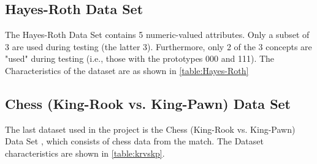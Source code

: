 \subsection{Hayes-Roth Data Set}

The Hayes-Roth Data Set\cite{HayesRothDatasetUCI} contains 5 numeric-valued attributes. Only a subset of 3 are used during testing (the latter 3). Furthermore, only 2 of the 3 concepts are "used" during testing (i.e., those with the prototypes 000 and 111). The Characteristics of the dataset are as shown in \ref{table:Hayes-Roth}\;

\begin{table}[ht]
\caption{\label{table:Hayes-Roth}Hayes-Roth Characteristics}
\end{table}

\subsection{Chess (King-Rook vs. King-Pawn) Data Set}

The last dataset used in the project is the Chess (King-Rook vs. King-Pawn) Data Set \cite{KPvsKRDatasetUCI}, which consists of chess data from the match. The Dataset characteristics are shown in \ref{table:krvskp}.

\begin{table}[ht]
\caption{\label{table:krvskp}Chess (King-Rook vs. King-Pawn) Characteristics}
\end{table}

